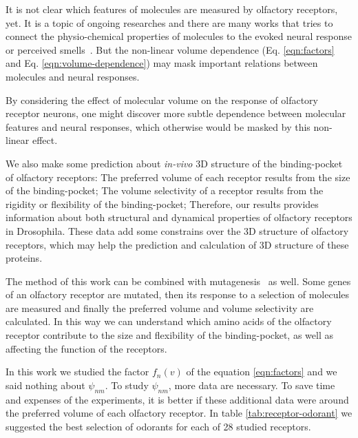 \documentclass[11pt]{paper} %
\newcommand{\numberofreceptors}{28 }
\begin{document}
It is not clear which features of molecules are measured by olfactory receptors, yet. 
It is a topic of ongoing researches  
and there are many works that tries to connect the physio-chemical properties of molecules to the evoked neural response or perceived smells~\cite{Snitz2013}.
But the non-linear volume dependence (Eq. \ref{eqn:factors} and Eq. \ref{eqn:volume-dependence})  
may mask important relations between molecules and neural responses.

By considering the effect of molecular volume on the response of olfactory receptor neurons, 
one might discover more subtle dependence between molecular features and neural responses, 
which otherwise would be masked by this non-linear effect.

We also make some prediction about {\it in-vivo} 3D structure of the binding-pocket of olfactory receptors:
The preferred volume of each receptor results from the size of the binding-pocket; 
The volume selectivity of a receptor results from the rigidity or flexibility of the binding-pocket; 
Therefore, our results provides information about both structural and dynamical properties of olfactory receptors in Drosophila. 
These data add some constrains over the 3D structure of olfactory receptors, 
which may help the prediction and calculation of 3D structure of these proteins. 

The method of this work can be combined with mutagenesis~\cite{} as well. 
Some genes of an olfactory receptor are mutated, 
then its response to a selection of molecules are measured and finally the preferred volume and volume selectivity are calculated.
In this way we can understand which amino acids of the olfactory receptor contribute to the size and flexibility of the binding-pocket, 
as well as affecting the function of the receptors.

In this work we studied the factor $f_n(v)$ of the equation \ref{eqn:factors} and we said nothing about $\psi_{nm}$. 
To study $\psi_{nm}$, more data are necessary. 
To save time and expenses of the experiments, 
it is better if these additional data were around the preferred volume of each olfactory receptor.
In table \ref{tab:receptor-odorant} we suggested the best selection of odorants for each of \numberofreceptors studied receptors.
\end{document}
